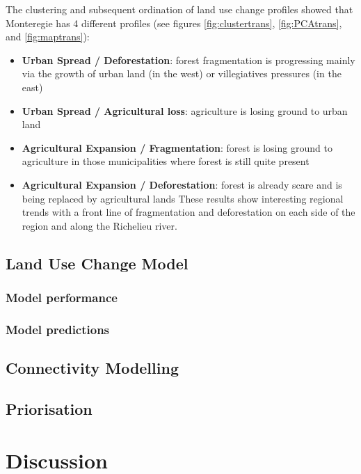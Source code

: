 The clustering and subsequent ordination of land use change profiles showed that Monteregie has 4 different profiles (see figures \ref{fig:clustertrans}, \ref{fig:PCAtrans}, and \ref{fig:maptrans}):
\begin{itemize}
  \item \textbf{Urban Spread / Deforestation}: forest fragmentation is progressing mainly via the growth of urban land (in the west) or villegiatives pressures (in the east)
  \item \textbf{Urban Spread / Agricultural loss}: agriculture is losing ground to urban land
  \item \textbf{Agricultural Expansion / Fragmentation}: forest is losing ground to agriculture in those municipalities where forest is still quite present
  \item \textbf{Agricultural Expansion / Deforestation}: forest is already scare and is being replaced by agricultural lands
These results show interesting regional trends with a front line of fragmentation and deforestation on each side of the region and along the Richelieu river. \\ %
\end{itemize}

\subsection{Land Use Change Model}

\subsubsection{Model performance}

\subsubsection{Model predictions}

\subsection{Connectivity Modelling}

\subsection{Priorisation}

\section{Discussion}

